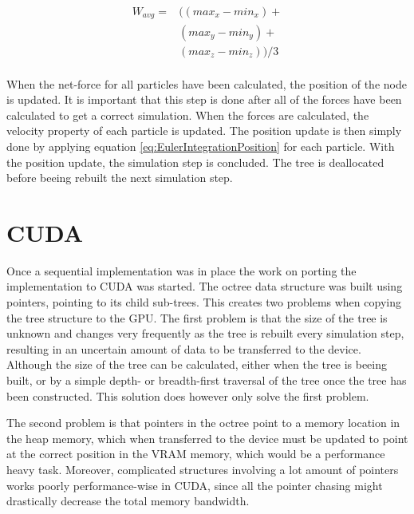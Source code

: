 \begin{equation} \label{eq:Wavg}
    \begin{split}
    W_{avg} = &((max_x - min_x) + \\
              &(max_y - min_y) + \\
              &(max_z - min_z)) / 3 \\
    \end{split}
\end{equation}

When the net-force for all particles have been calculated, the position of the node is updated. It is important that this step is done after all of the forces have been calculated to get a correct simulation.
When the forces are calculated, the velocity property of each particle is updated. The position update is then simply done by applying equation \ref{eq:EulerIntegrationPosition} for each particle. With the position update, the simulation step is concluded. The tree is deallocated before beeing rebuilt the next simulation step. 

\section{CUDA} \label{sec:CUDAImplementation}
Once a sequential implementation was in place the work on porting the implementation to CUDA was started.
The octree data structure was built using pointers, pointing to its child sub-trees. This creates two problems when copying the tree structure to the GPU. The first problem is that the size of the tree is unknown and changes very frequently as the tree is rebuilt every simulation step, resulting in an uncertain amount of data to be transferred to the device. Although the size of the tree can be calculated, either when the tree is beeing built, or by a simple depth- or breadth-first traversal of the tree once the tree has been constructed. This solution does however only solve the first problem.

The second problem is that pointers in the octree point to a memory location in the heap memory, which when transferred to the device must be updated to point at the correct position in the VRAM memory, which would be a performance heavy task. Moreover, complicated structures involving a lot amount of pointers works poorly performance-wise in CUDA, since all the pointer chasing might drastically decrease the total memory bandwidth. 

